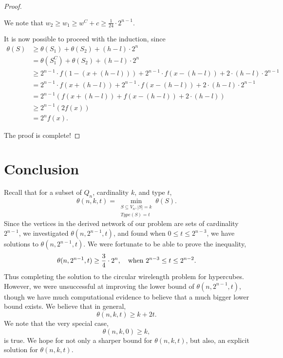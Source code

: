 \documentclass[12pt]{ucthesis}
\theoremstyle{plain}
\theoremstyle{definition}
\begin{document}
\begin{proof}
\begin{enumerate}[(1)]
	We note that $w_2 \ge w_1 \ge w^C + c \ge \frac{1}{24} \cdot 2^{n - 1}$.

	It is now possible to proceed with the induction, since
	\begin{align*}
	\theta(S)
	& \ge \theta(S_1) + \theta(S_2) + (h - l) \cdot 2^n \\
	& = \theta(S_1^C) + \theta(S_2) + (h - l) \cdot 2^n \\
	& \ge 2^{n - 1} \cdot f(1 - (x + (h - l))) +
	      2^{n - 1} \cdot f(x - (h - l)) + 2 \cdot (h - l) \cdot 2^{n - 1} \\
	& = 2^{n - 1} \cdot f(x + (h - l)) + 2^{n - 1} \cdot f(x - (h - l)) +
	    2 \cdot (h - l) \cdot 2^{n - 1} \\
	& = 2^{n - 1} (f(x + (h - l)) + f(x - (h - l)) + 2 \cdot (h - l)) \\
	& \ge 2^{n - 1} (2 f(x)) \\
	& = 2^n f(x).
	\end{align*}
\end{enumerate}
The proof is complete!
\end{proof}

\chapter{Conclusion}
\label{Chapter 5}

Recall that for a subset of $Q_n$, cardinality $k$, and type $t$,
\begin{equation*}
\theta(n, k, t) = \min_{\substack{
	S \subseteq V_n, |S| = k \\
	Type(S) = t
}} \theta(S).
\end{equation*}
Since the vertices in the derived network of our problem are sets of cardinality $2^{n - 1}$,
we investigated $\theta(n, 2^{n - 1}, t)$,
and found when $0 \le t \le 2^{n - 3}$, we have solutions to $\theta(n, 2^{n - 1}, t)$.
We were fortunate to be able to prove the inequality,
\begin{equation*}
\theta(n, 2^{n - 1}, t) \ge \frac{3}{4} \cdot 2^n, \quad
\textnormal{when } 2^{n - 3} \le t \le 2^{n - 2}.
\end{equation*}
Thus completing the solution to the circular wirelength problem for hypercubes.
However, we were unsuccessful at improving the lower bound of $\theta(n, 2^{n - 1}, t)$,
though we have much computational evidence to believe that a much bigger lower bound exists.
We believe that in general,
\begin{equation*}
\theta(n, k, t) \ge k + 2 t.
\end{equation*}
We note that the very special case,
\begin{equation*}
\theta(n, k, 0) \ge k,
\end{equation*}
is true.
We hope for not only a sharper bound for $\theta(n, k, t)$,
but also, an explicit solution for $\theta(n, k, t)$.
\end{document}

